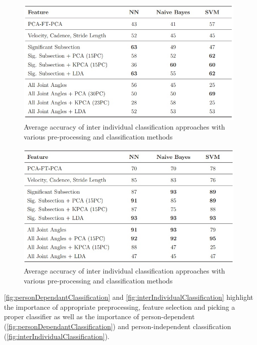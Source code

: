 \documentclass[conference]{IEEEtran}
\begin{document}
\begin{figure}[H]
\centering
\includegraphics[width=\linewidth]{interIndividualClassification.jpg}
\caption{Average accuracy of inter individual classification approaches with various pre-processing and classification methods\cite{karg2012pattern}}
\label{fig:interIndividualClassification}
\end{figure}

\begin{figure}[H]
\centering
\includegraphics[width=\linewidth]{personDependantClassification.jpg}
\caption{Average accuracy of inter individual classification approaches with various pre-processing and classification methods\cite{karg2012pattern}}
\label{fig:personDependantClassification}
\end{figure}

\autoref{fig:personDependantClassification} and \autoref{fig:interIndividualClassification} highlight the importance of appropriate preprocessing, feature selection and picking a proper classifier as well as the importance of person-dependent (\autoref{fig:personDependantClassification}) and person-independent classification (\autoref{fig:interIndividualClassification}).\
\end{document}
